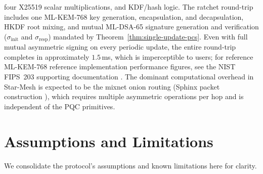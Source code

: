 \documentclass[11pt,a4paper]{article}
\theoremstyle{remark}
\theoremstyle{plain}
\begin{document}
four X25519 scalar multiplications, and KDF/hash logic. The ratchet round-trip includes
one ML-KEM-768 key generation, encapsulation, and decapsulation, HKDF root mixing, and mutual
ML-DSA-65 signature generation and verification ($\sigma_{\mathrm{init}}$ and $\sigma_{\mathrm{resp}}$)
mandated by Theorem~\ref{thm:single-update-pcs}.
Even with full mutual asymmetric signing on every periodic update, the entire round-trip completes in approximately $1.5$\,ms, which is imperceptible to users; for reference ML-KEM-768 reference implementation performance figures, see the NIST FIPS~203 supporting documentation \cite{nist_fips203}.
The dominant computational overhead in Star-Mesh is expected to be the mixnet onion routing (Sphinx packet construction \cite{sphinx}), which requires multiple asymmetric operations per hop and is independent of the PQC primitives.

\section{Assumptions and Limitations}
\label{sec:assumptionslimitations}

We consolidate the protocol's assumptions and known limitations here for clarity.
\end{document}
